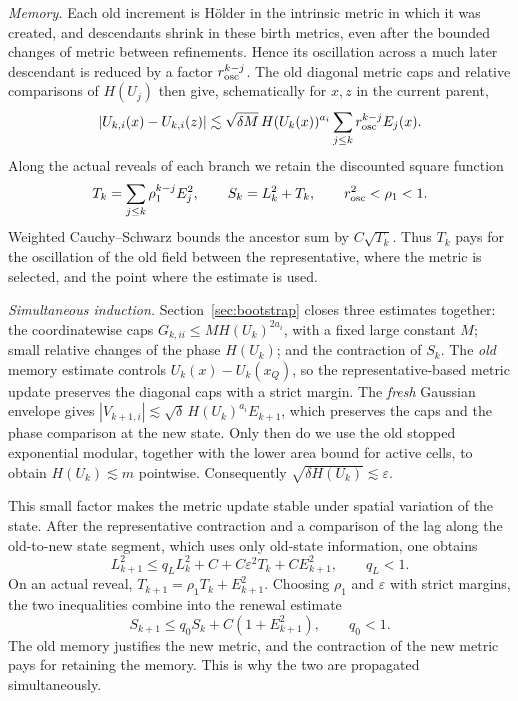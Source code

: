 \documentclass[11pt]{article}
\theoremstyle{definition}
\theoremstyle{remark}
\numberwithin{equation}{section}
\begin{document}
\emph{Memory.}
Each old increment is H\"older in the intrinsic metric in which it
was created, and descendants shrink in these birth metrics, even
after the bounded changes of metric between refinements. Hence its
oscillation across a much later descendant is reduced by a factor
$r_{\rm osc}^{k-j}$. The old diagonal metric caps and relative
comparisons of $H(U_j)$ then give, schematically for $x,z$ in the
current parent,
\[
 |U_{k,i}(x)-U_{k,i}(z)|
 \lesssim\sqrt{\delta M}\,H(U_k(x))^{a_i}
       \sum_{j\le k}r_{\rm osc}^{k-j}E_j(x).
\]
Along the actual reveals of each branch we retain the discounted
square function
\[
 T_k=\sum_{j\le k}\rho_1^{k-j}E_j^2,\qquad
 S_k=L_k^2+T_k,\qquad r_{\rm osc}^2<\rho_1<1.
\]
Weighted Cauchy--Schwarz bounds the ancestor sum by $C\sqrt{T_k}$.
Thus $T_k$ pays for the oscillation of the old field between the
representative, where the metric is selected, and the point where
the estimate is used.

\emph{Simultaneous induction.}
Section~\ref{sec:bootstrap} closes three estimates together: the
coordinatewise caps $G_{k,ii}\le M H(U_k)^{2a_i}$, with a fixed
large constant $M$; small relative changes of the phase $H(U_k)$;
and the contraction of $S_k$. The \emph{old} memory estimate controls
$U_k(x)-U_k(x_Q)$, so the representative-based metric update
preserves the diagonal caps with a strict margin. The \emph{fresh}
Gaussian envelope gives
$|V_{k+1,i}|\lesssim\sqrt\delta\,H(U_k)^{a_i}E_{k+1}$, which
preserves the caps and the phase comparison at the new state. Only
then do we use the old stopped exponential modular, together with
the lower area bound for active cells, to obtain $H(U_k)\lesssim m$
pointwise. Consequently $\sqrt{\delta H(U_k)}\lesssim\varepsilon$.

This small factor makes the metric update stable under spatial
variation of the state. After the representative contraction and a
comparison of the lag along the old-to-new state segment, which uses
only old-state information, one obtains
\[
 L_{k+1}^2\le q_L L_k^2+C+C\varepsilon^2T_k
                       +CE_{k+1}^2,\qquad q_L<1.
\]
On an actual reveal, $T_{k+1}=\rho_1T_k+E_{k+1}^2$. Choosing
$\rho_1$ and $\varepsilon$ with strict margins, the two inequalities
combine into the renewal estimate
\begin{equation}\label{eq:intro-renewal}
 \boxed{\quad S_{k+1}\le q_0S_k+C(1+E_{k+1}^2),
                   \qquad q_0<1.\quad}
\end{equation}
The old memory justifies the new metric, and the contraction of the
new metric pays for retaining the memory. This is why the two are
propagated simultaneously.
\end{document}

